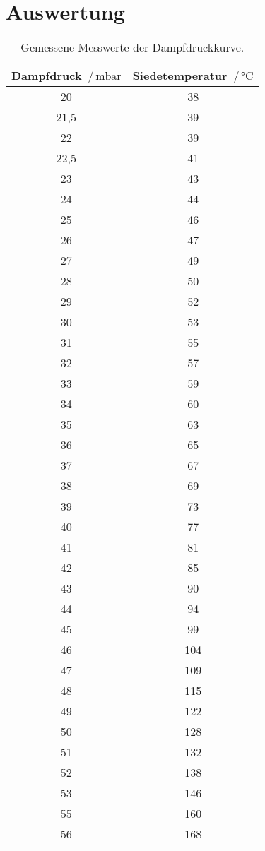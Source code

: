 \section{Auswertung}
\label{sec:Auswertung}

\begin{table}[H]
  \centering
  \caption{Gemessene Messwerte der Dampfdruckkurve.}
  \label{tab:werte1}
  \begin{tabular}{c c}
    \toprule
    Dampfdruck $\,/\,\si{\milli\bar}$ & Siedetemperatur $\,/\, \si{\celsius}$ \\
    \midrule
    20 & 38 \\
    21,5 & 39 \\
    22 & 39 \\
    22,5 & 41 \\
    23 & 43 \\
    24 & 44 \\
    25 & 46 \\
    26 & 47 \\
    27 & 49 \\
    28 & 50 \\
    29 & 52 \\
    30 & 53 \\
    31 & 55 \\
    32 & 57 \\
    33 & 59 \\
    34 & 60 \\
    35 & 63 \\
    36 & 65 \\
    37 & 67 \\
    38 & 69 \\
    39 & 73 \\
    40 & 77 \\
    41 & 81 \\
    42 & 85 \\
    43 & 90 \\
    44 & 94 \\
    45 & 99 \\
    46 & 104 \\
    47 & 109 \\
    48 & 115 \\
    49 & 122 \\
    50 & 128 \\
    51 & 132 \\
    52 & 138 \\
    53 & 146 \\
    55 & 160 \\
    56 & 168 \\

\end{tabular}
\end{table}

